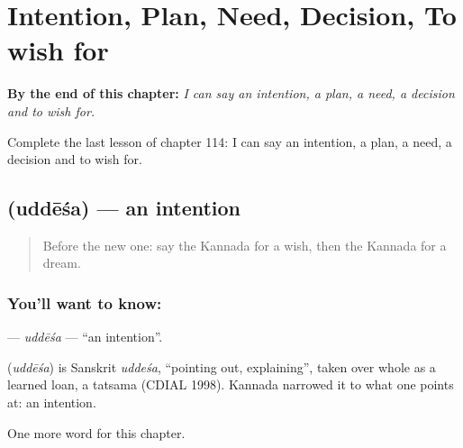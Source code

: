 
\chapter{Intention, Plan, Need, Decision, To wish for}
\label{ch:ka-intention-plan-need-decision-to-wish-for}

\begin{chapteropening}
\textbf{By the end of this chapter:} \emph{I can say an intention, a plan, a need, a decision and to wish for.}

Complete the last lesson of chapter 114: I can say an intention, a plan, a need, a decision and to wish for.
\end{chapteropening}

\section[\texorpdfstring{\kn{ಉದ್ದೇಶ} (uddēśa)}{ಉದ್ದೇಶ (uddēśa)}]{ (uddēśa) — an intention}

\label{lesson:KA-C114-uddesa}



\begin{quote}
Before the new one: say the Kannada for a wish, then the Kannada for a dream.
\end{quote}

\subsection*{You'll want to know: }
\textbf{} — \emph{uddēśa} — \textquotedblleft{}an intention\textquotedblright{}.

\begin{cousinweb}
\textbf{} (\emph{uddēśa}) is Sanskrit \emph{uddeśa}, \textquotedblleft{}pointing out, explaining\textquotedblright{}, taken over whole as a learned loan, a tatsama (CDIAL 1998). Kannada narrowed it to what one points at: an intention.
\end{cousinweb}

\begin{grammarlens}[title={What you've built}]
One more word for this chapter.
\end{grammarlens}

